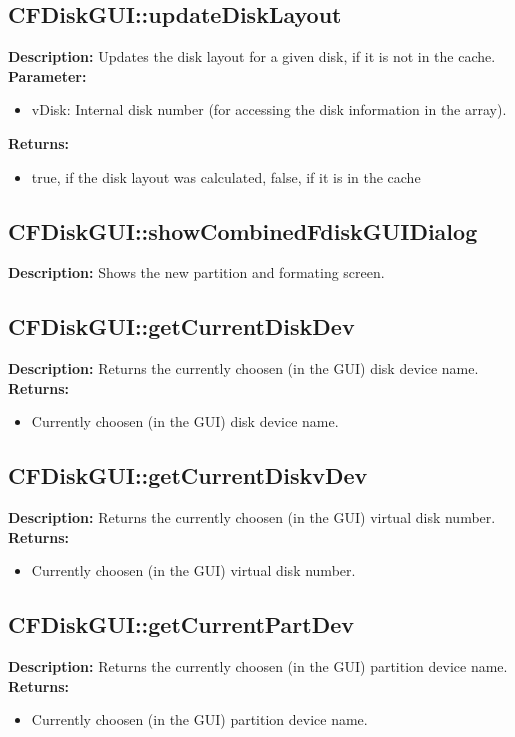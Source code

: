 \subsection{CFDiskGUI::updateDiskLayout}
\textbf{Description:} Updates the disk layout for a given disk, if it is not in the cache.\\
\textbf{Parameter:}
\begin{itemize}
\item vDisk: Internal disk number (for accessing the disk information in the array).
\end{itemize}
\textbf{Returns:}
\begin{itemize}
\item true, if the disk layout was calculated, false, if it is in the cache 
\end{itemize}

\subsection{CFDiskGUI::showCombinedFdiskGUIDialog}
\textbf{Description:} Shows the new partition and formating screen.\\

\subsection{CFDiskGUI::getCurrentDiskDev}
\textbf{Description:} Returns the currently choosen (in the GUI) disk device name.\\
\textbf{Returns:}
\begin{itemize}
\item Currently choosen (in the GUI) disk device name.
\end{itemize}

\subsection{CFDiskGUI::getCurrentDiskvDev}
\textbf{Description:} Returns the currently choosen (in the GUI) virtual disk number.\\
\textbf{Returns:}
\begin{itemize}
\item Currently choosen (in the GUI) virtual disk number.
\end{itemize}

\subsection{CFDiskGUI::getCurrentPartDev}
\textbf{Description:} Returns the currently choosen (in the GUI) partition device name.\\
\textbf{Returns:}
\begin{itemize}
\item Currently choosen (in the GUI) partition device name.
\end{itemize}

